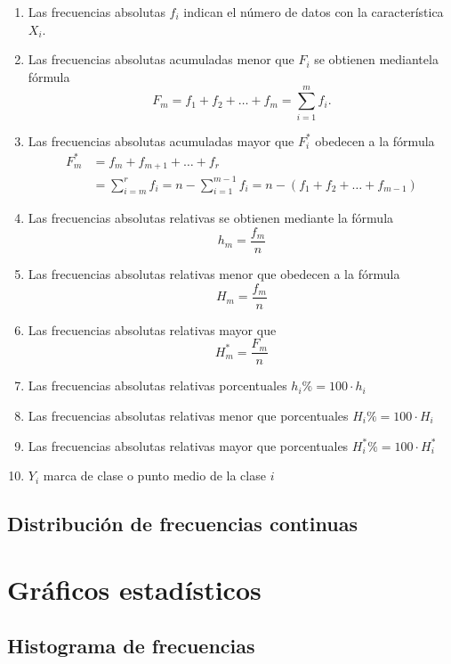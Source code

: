 \documentclass[a4paper]{report}
\begin{document}
\begin{enumerate}
	\item  Las frecuencias absolutas $f_i$ indican el número de datos con la característica $X_i$.
	\item  Las frecuencias absolutas acumuladas menor que $F_i$ se obtienen mediantela fórmula $$F_m=f_1+f_2+\ldots+f_m=\sum_{i=1}^mf_i.$$
	\item   Las frecuencias absolutas acumuladas mayor que $F_i^*$ obedecen a la fórmula
	      $$
		      \begin{aligned}
			      F_m^* & =f_m+f_{m+1}+\ldots+f_r                                                          \\
			            & =\sum_{i=m}^rf_i =n-\sum_{i=1}^{m-1}f_i =n-\left(f_1+f_{2}+\ldots+f_{m-1}\right)
		      \end{aligned}
	      $$
	\item  Las frecuencias absolutas relativas se obtienen mediante la fórmula $$h_m=\frac{f_m}{n}$$
	\item  Las frecuencias absolutas relativas menor que obedecen a la fórmula $$H_m=\frac{f_m}{n}$$
	\item  Las frecuencias absolutas relativas mayor que $$H_m^*=\frac{F_m}{n}$$
	\item  Las frecuencias absolutas relativas porcentuales $h_i\%=100\cdot h_i$
	\item  Las frecuencias absolutas relativas menor que porcentuales  $H_i\%=100\cdot H_i$
	\item  Las frecuencias absolutas relativas mayor que porcentuales $H_i^*\%=100\cdot H_i^*$
	\item  $Y_i$ marca de clase o punto medio de la clase $i$
\end{enumerate}


\subsection{Distribución de frecuencias continuas}


\section{Gráficos estadísticos}

\subsection{Histograma de frecuencias}
\end{document}
